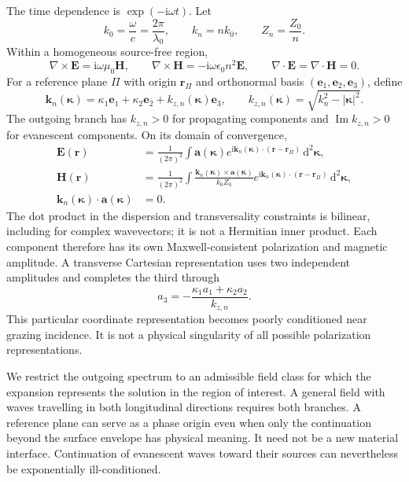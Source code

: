 \documentclass[11pt,a4paper]{article}
\newcommand{\vct}[1]{\bm{#1}}
\newcommand{\kap}{\vct\kappa}
\newcommand{\dd}{\mathrm d}
\newcommand{\ii}{\mathrm i}
\DeclareMathOperator{\Ima}{Im}
\numberwithin{equation}{section}
\begin{document}
The time dependence is $\exp(-\ii\omega t)$. Let
\begin{equation}
 k_0=\frac{\omega}{c}=\frac{2\pi}{\lambda_0},\qquad
 k_n=nk_0,\qquad Z_n=\frac{Z_0}{n}.
\end{equation}
Within a homogeneous source-free region,
\begin{equation}
 \nabla\times\vct E=\ii\omega\mu_0\vct H,
 \qquad
 \nabla\times\vct H=-\ii\omega\epsilon_0 n^2\vct E,
 \qquad \nabla\cdot\vct E=\nabla\cdot\vct H=0.
 \label{eq:maxwell}
\end{equation}
For a reference plane $\Pi$ with origin $\vct r_\Pi$ and orthonormal basis
$(\vct e_1,\vct e_2,\vct e_3)$, define
\begin{equation}
 \vct k_n(\kap)=\kappa_1\vct e_1+\kappa_2\vct e_2
       +k_{z,n}(\kap)\vct e_3,
 \qquad k_{z,n}(\kap)=\sqrt{k_n^2-|\kap|^2}.
 \label{eq:dispersion}
\end{equation}
The outgoing branch has $k_{z,n}>0$ for propagating components and
$\Ima k_{z,n}>0$ for evanescent components. On its domain of convergence,
\begin{align}
 \vct E(\vct r)&=\frac{1}{(2\pi)^2}\int
    \vct a(\kap)e^{\ii\vct k_n(\kap)\cdot(\vct r-\vct r_\Pi)}\,\dd^2\kap,
    \label{eq:angularE}\\
 \vct H(\vct r)&=\frac{1}{(2\pi)^2}\int
    \frac{\vct k_n(\kap)\times\vct a(\kap)}{k_0Z_0}
    e^{\ii\vct k_n(\kap)\cdot(\vct r-\vct r_\Pi)}\,\dd^2\kap,
    \label{eq:angularH}\\
 \vct k_n(\kap)\cdot\vct a(\kap)&=0.
 \label{eq:transverse}
\end{align}
The dot product in the dispersion and transversality constraints is bilinear,
including for complex wavevectors; it is not a Hermitian inner product.
Each component therefore has its own Maxwell-consistent polarization and
magnetic amplitude. A transverse Cartesian representation uses two independent
amplitudes and completes the third through
\begin{equation}
 a_3=-\frac{\kappa_1a_1+\kappa_2a_2}{k_{z,n}}.
 \label{eq:completion}
\end{equation}
This particular coordinate representation becomes poorly conditioned near
grazing incidence. It is not a physical singularity of all possible
polarization representations.

We restrict the outgoing spectrum to an admissible field class for which the
expansion represents the solution in the region of interest. A general field
with waves travelling in both longitudinal directions requires both branches.
A reference plane can serve as a phase origin even when only the continuation
beyond the surface envelope has physical meaning. It need not be a new material
interface. Continuation of evanescent waves toward their sources can nevertheless
be exponentially ill-conditioned.
\end{document}

